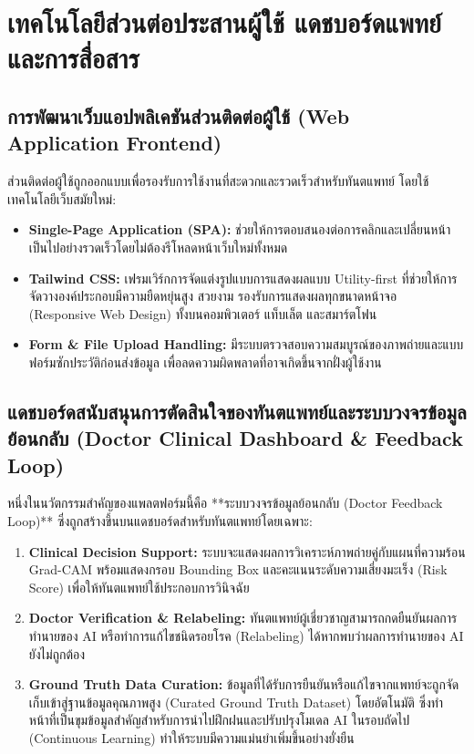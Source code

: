 \section{เทคโนโลยีส่วนต่อประสานผู้ใช้ แดชบอร์ดแพทย์ และการสื่อสาร}
\label{sec:ui_dashboard_comm}

\subsection{การพัฒนาเว็บแอปพลิเคชันส่วนติดต่อผู้ใช้ (Web Application Frontend)}
ส่วนติดต่อผู้ใช้ถูกออกแบบเพื่อรองรับการใช้งานที่สะดวกและรวดเร็วสำหรับทันตแพทย์ โดยใช้เทคโนโลยีเว็บสมัยใหม่:
\begin{itemize}
    \item \textbf{Single-Page Application (SPA):} ช่วยให้การตอบสนองต่อการคลิกและเปลี่ยนหน้าเป็นไปอย่างรวดเร็วโดยไม่ต้องรีโหลดหน้าเว็บใหม่ทั้งหมด
    \item \textbf{Tailwind CSS:} เฟรมเวิร์กการจัดแต่งรูปแบบการแสดงผลแบบ Utility-first ที่ช่วยให้การจัดวางองค์ประกอบมีความยืดหยุ่นสูง สวยงาม รองรับการแสดงผลทุกขนาดหน้าจอ (Responsive Web Design) ทั้งบนคอมพิวเตอร์ แท็บเล็ต และสมาร์ตโฟน
    \item \textbf{Form \& File Upload Handling:} มีระบบตรวจสอบความสมบูรณ์ของภาพถ่ายและแบบฟอร์มซักประวัติก่อนส่งข้อมูล เพื่อลดความผิดพลาดที่อาจเกิดขึ้นจากฝั่งผู้ใช้งาน
\end{itemize}

\subsection{แดชบอร์ดสนับสนุนการตัดสินใจของทันตแพทย์และระบบวงจรข้อมูลย้อนกลับ (Doctor Clinical Dashboard \& Feedback Loop)}
หนึ่งในนวัตกรรมสำคัญของแพลตฟอร์มนี้คือ **ระบบวงจรข้อมูลย้อนกลับ (Doctor Feedback Loop)** ซึ่งถูกสร้างขึ้นบนแดชบอร์ดสำหรับทันตแพทย์โดยเฉพาะ:
\begin{enumerate}
    \item \textbf{Clinical Decision Support:} ระบบจะแสดงผลการวิเคราะห์ภาพถ่ายคู่กับแผนที่ความร้อน Grad-CAM พร้อมแสดงกรอบ Bounding Box และคะแนนระดับความเสี่ยงมะเร็ง (Risk Score) เพื่อให้ทันตแพทย์ใช้ประกอบการวินิจฉัย
    \item \textbf{Doctor Verification \& Relabeling:} ทันตแพทย์ผู้เชี่ยวชาญสามารถกดยืนยันผลการทำนายของ AI หรือทำการแก้ไขชนิดรอยโรค (Relabeling) ได้หากพบว่าผลการทำนายของ AI ยังไม่ถูกต้อง
    \item \textbf{Ground Truth Data Curation:} ข้อมูลที่ได้รับการยืนยันหรือแก้ไขจากแพทย์จะถูกจัดเก็บเข้าสู่ฐานข้อมูลคุณภาพสูง (Curated Ground Truth Dataset) โดยอัตโนมัติ ซึ่งทำหน้าที่เป็นขุมข้อมูลสำคัญสำหรับการนำไปฝึกฝนและปรับปรุงโมเดล AI ในรอบถัดไป (Continuous Learning) ทำให้ระบบมีความแม่นยำเพิ่มขึ้นอย่างยั่งยืน
\end{enumerate}

